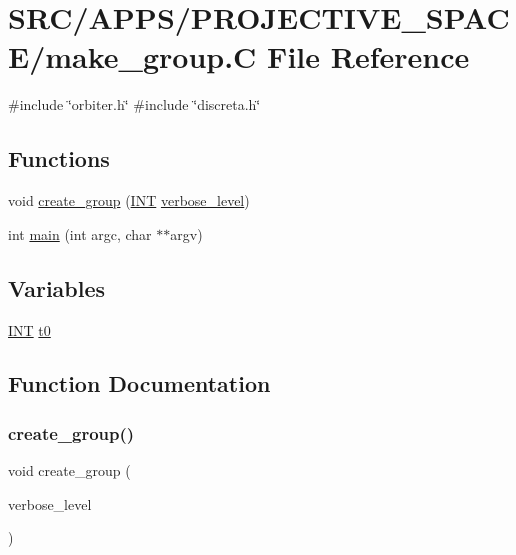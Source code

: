 \hypertarget{make__group_8_c}{}\section{S\+R\+C/\+A\+P\+P\+S/\+P\+R\+O\+J\+E\+C\+T\+I\+V\+E\+\_\+\+S\+P\+A\+C\+E/make\+\_\+group.C File Reference}
\label{make__group_8_c}
{\ttfamily \#include \char`\"{}orbiter.\+h\char`\"{}}\newline
{\ttfamily \#include \char`\"{}discreta.\+h\char`\"{}}\newline
\subsection*{Functions}
\begin{DoxyCompactItemize}
\item 
void \mbox{\hyperlink{make__group_8_c_a7a960a16a33af0e67df207121abca6dc}{create\+\_\+group}} (\mbox{\hyperlink{galois_8h_a09fddde158a3a20bd2dcadb609de11dc}{I\+NT}} \mbox{\hyperlink{simeon_8_c_a818073fbcc2f439e7c56952f67386122}{verbose\+\_\+level}})
\item 
int \mbox{\hyperlink{make__group_8_c_a3c04138a5bfe5d72780bb7e82a18e627}{main}} (int argc, char $\ast$$\ast$argv)
\end{DoxyCompactItemize}
\subsection*{Variables}
\begin{DoxyCompactItemize}
\item 
\mbox{\hyperlink{galois_8h_a09fddde158a3a20bd2dcadb609de11dc}{I\+NT}} \mbox{\hyperlink{make__group_8_c_a4268f4fe222ffb119218a0199f5e1904}{t0}}
\end{DoxyCompactItemize}


\subsection{Function Documentation}
\mbox{\label{make__group_8_c_a7a960a16a33af0e67df207121abca6dc}} 
\subsubsection{\texorpdfstring{create\+\_\+group()}{create\_group()}}
{\footnotesize\ttfamily void create\+\_\+group (\begin{DoxyParamCaption}\item[{\mbox{\hyperlink{galois_8h_a09fddde158a3a20bd2dcadb609de11dc}{I\+NT}}}]{verbose\+\_\+level }\end{DoxyParamCaption})}

